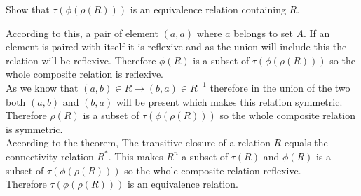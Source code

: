 \documentclass[addpoints]{exam}
\begin{document}
\begin{questions}
    Show that $\tau (\phi (\rho (R)))$ is an equivalence relation containing $R$.
    
      \begin{solution}
    According to this, a pair of element $(a,a)$ where $a$ belongs to set $A$. If an element is paired with itself it is reflexive and as the union will include this the relation will be reflexive. Therefore $\phi(R)$ is a subset of $\tau (\phi (\rho (R)))$ so the whole composite relation is reflexive.\\
        As we know that $(a,b) \in R \rightarrow (b,a)  \in R^{-1}$ therefore in the union of the two both $(a,b)$ and $(b,a)$ will be present which makes this relation symmetric. Therefore $\rho(R)$ is a subset of $\tau (\phi (\rho (R)))$ so the whole composite relation is symmetric.\\
         According to the theorem, The transitive closure of a relation $R$ equals the connectivity relation $R^{*}$. This makes $R^{n}$ a subset of $\tau(R)$ and $\phi(R)$ is a subset of $\tau (\phi (\rho (R)))$ so the whole composite relation reflexive.\\
      Therefore $\tau (\phi (\rho (R)))$ is an equivalence relation.
  \end{solution}


\end{questions}
\end{document}
